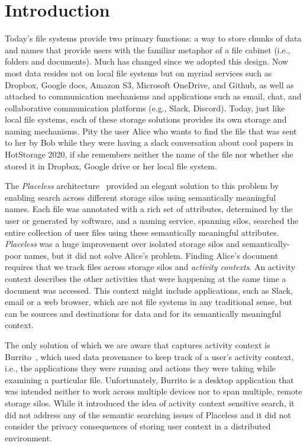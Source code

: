 
\section{Introduction}
\label{sec:intro}

Today's file systems provide two primary functions: a way to store chunks of data and names that provide users with the familiar
metaphor of a file cabinet (i.e., folders and documents).
Much has changed since we adopted this design.
Now most data resides not on local file systems but on myriad services such as Dropbox, Google docs, Amazon S3, Microsoft OneDrive, and Github, as well as attached to communication mechanisms and applications such as email, chat, and collaborative communication platforms (e.g., Slack, Discord).
Today, just like local file systems, each of these storage solutions provides its own storage and naming mechanisms. Pity the user Alice who wants to find the file that was sent to her by Bob while they were having a slack conversation about cool papers in HotStorage 2020, if she remembers neither the name of the file nor whether she stored it in Dropbox, Google drive or her local file system.

The \emph{Placeless} architecture~\cite{placeless-tois} provided an elegant solution to this problem by enabling search across different storage silos using semantically meaningful names. Each file was annotated with a rich set of attributes, determined by the user or generated by software, and a naming service, spanning silos, searched the entire collection of user files using these semantically meaningful attributes. \emph{Placeless} was a huge improvement over isolated storage silos and semantically-poor names, but it did not solve Alice’s problem. Finding Alice's document requires that we track files across storage silos and \emph{activity contexts}. An activity context describes the other activities that were happening at the same time a document was accessed. This context might include applications, such as Slack, email or a web browser, which are not file systems in any traditional sense, but can be sources and destinations for data and for its semantically meaningful context.

The only solution of which we are aware that captures activity context is Burrito~\cite{guo2012burrito}, which used data provenance to keep track of a user’s activity context, i.e., the applications they were running and actions they were taking while examining a particular file. Unfortunately, Burrito is a desktop application that was intended neither to work across multiple devices nor to span multiple, remote storage silos. While it introduced the idea of activity context sensitive search, it did not address any of the semantic searching issues of Placeless and it did not consider the privacy consequences of storing user context in a distributed environment.

